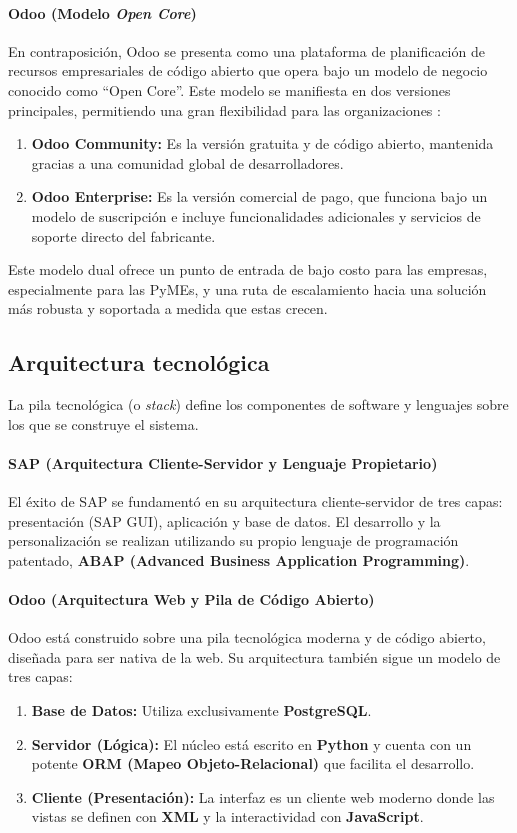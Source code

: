 \documentclass[12pt,letterpaper,spanish]{report}
\begin{document}
\paragraph{Odoo (Modelo \textit{Open Core})}
En contraposición, Odoo se presenta como una plataforma de planificación de recursos empresariales de código abierto \cite{pretell2024mejora} que opera bajo un modelo de negocio conocido como ``Open Core''. Este modelo se manifiesta en dos versiones principales, permitiendo una gran flexibilidad para las organizaciones \cite{TortCarrillo2024}:
\begin{enumerate}
    \item \textbf{Odoo Community:} Es la versión gratuita y de código abierto, mantenida gracias a una comunidad global de desarrolladores.
    \item \textbf{Odoo Enterprise:} Es la versión comercial de pago, que funciona bajo un modelo de suscripción e incluye funcionalidades adicionales y servicios de soporte directo del fabricante.
\end{enumerate}
Este modelo dual ofrece un punto de entrada de bajo costo para las empresas, especialmente para las PyMEs, y una ruta de escalamiento hacia una solución más robusta y soportada a medida que estas crecen.

\subsection{Arquitectura tecnológica}

La pila tecnológica (o \textit{stack}) define los componentes de software y lenguajes sobre los que se construye el sistema.

\paragraph{SAP (Arquitectura Cliente-Servidor y Lenguaje Propietario)}
El éxito de SAP se fundamentó en su arquitectura cliente-servidor de tres capas: presentación (SAP GUI), aplicación y base de datos. El desarrollo y la personalización se realizan utilizando su propio lenguaje de programación patentado, \textbf{ABAP (Advanced Business Application Programming)}.

\paragraph{Odoo (Arquitectura Web y Pila de Código Abierto)}
Odoo está construido sobre una pila tecnológica moderna y de código abierto, diseñada para ser nativa de la web. Su arquitectura también sigue un modelo de tres capas:
\begin{enumerate}
    \item \textbf{Base de Datos:} Utiliza exclusivamente \textbf{PostgreSQL}.
    \item \textbf{Servidor (Lógica):} El núcleo está escrito en \textbf{Python} y cuenta con un potente \textbf{ORM (Mapeo Objeto-Relacional)} que facilita el desarrollo.
    \item \textbf{Cliente (Presentación):} La interfaz es un cliente web moderno donde las vistas se definen con \textbf{XML} y la interactividad con \textbf{JavaScript}.
\end{enumerate}
\end{document}
